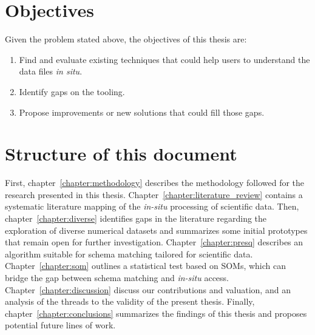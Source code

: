 \section{Objectives}


Given the problem stated above, the objectives of this thesis are:

\begin{enumerate}
    \item Find and evaluate existing techniques that could help users to understand the data files
        \emph{in situ}.
    \item Identify gaps on the tooling.
    \item Propose improvements or new solutions that could fill those gaps.
    \label{enum:objectives}
\end{enumerate}

\section{Structure of this document}

First, chapter~\ref{chapter:methodology} describes the methodology followed
for the research presented in this thesis.
Chapter~\ref{chapter:literature_review} contains a systematic literature mapping
of the \emph{in-situ} processing of scientific data.
Then, chapter~\ref{chapter:diverse} identifies gaps in the literature regarding
the exploration of diverse numerical datasets and summarizes some initial prototypes
that remain open for further investigation.
Chapter~\ref{chapter:presq} describes an algorithm suitable for schema matching
tailored for scientific data. Chapter~\ref{chapter:som} outlines a statistical
test based on \glspl{SOM}, which can bridge the gap between schema matching and
\emph{in-situ} access.
Chapter~\ref{chapter:discussion} discuss our contributions and valuation,
and an analysis of the threads to the validity of the present thesis.
Finally, chapter~\ref{chapter:conclusions} summarizes the findings of this
thesis and proposes potential future lines of work.
